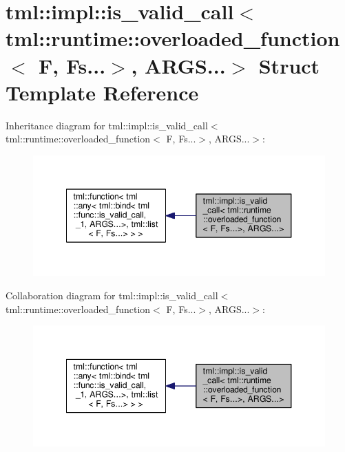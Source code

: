 \hypertarget{structtml_1_1impl_1_1is__valid__call_3_01tml_1_1runtime_1_1overloaded__function_3_01_f_00_01_fs_8_8_8_4_00_01_a_r_g_s_8_8_8_4}{\section{tml\+:\+:impl\+:\+:is\+\_\+valid\+\_\+call$<$ tml\+:\+:runtime\+:\+:overloaded\+\_\+function$<$ F, Fs...$>$, A\+R\+G\+S...$>$ Struct Template Reference}
\label{structtml_1_1impl_1_1is__valid__call_3_01tml_1_1runtime_1_1overloaded__function_3_01_f_00_01_fs_8_8_8_4_00_01_a_r_g_s_8_8_8_4}
}


Inheritance diagram for tml\+:\+:impl\+:\+:is\+\_\+valid\+\_\+call$<$ tml\+:\+:runtime\+:\+:overloaded\+\_\+function$<$ F, Fs...$>$, A\+R\+G\+S...$>$\+:
\nopagebreak
\begin{figure}[H]
\begin{center}
\leavevmode
\includegraphics[width=348pt]{structtml_1_1impl_1_1is__valid__call_3_01tml_1_1runtime_1_1overloaded__function_3_01_f_00_01_fs_70bce9677de6d0b64704c502d408bbb7}
\end{center}
\end{figure}


Collaboration diagram for tml\+:\+:impl\+:\+:is\+\_\+valid\+\_\+call$<$ tml\+:\+:runtime\+:\+:overloaded\+\_\+function$<$ F, Fs...$>$, A\+R\+G\+S...$>$\+:
\nopagebreak
\begin{figure}[H]
\begin{center}
\leavevmode
\includegraphics[width=348pt]{structtml_1_1impl_1_1is__valid__call_3_01tml_1_1runtime_1_1overloaded__function_3_01_f_00_01_fs_7de613d431e03e8641efe045e53907d8}
\end{center}
\end{figure}
